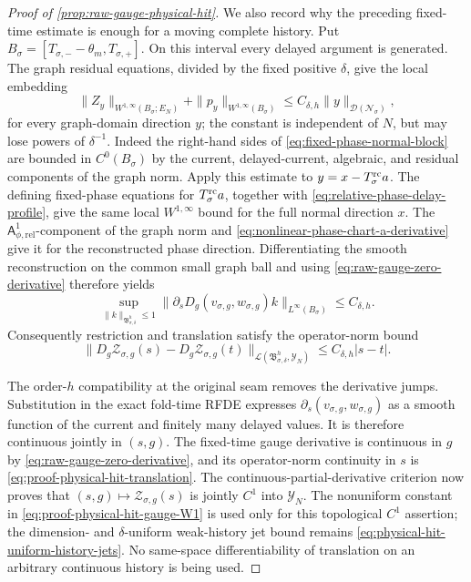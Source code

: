 \begin{proof}[Proof of
\cref{prop:raw-gauge-physical-hit}]
We also record why the preceding fixed-time estimate is enough for a moving
complete history.  Put
\(B_\sigma=[T_{\sigma,-}-\theta_m,T_{\sigma,+}]\).  On this interval every
delayed argument is generated.  The graph residual equations, divided by
the fixed positive \(\delta\), give the local embedding
\begin{equation}
 \|Z_y\|_{W^{1,\infty}(B_\sigma;E_N)}
 +\|p_y\|_{W^{1,\infty}(B_\sigma)}
 \le C_{\delta,h}\|y\|_{\mathcal D(\mathscr N_\sigma)},
                                                        \label{eq:proof-physical-hit-local-graph-embedding}
\end{equation}
for every graph-domain direction \(y\); the constant is independent of
\(N\), but may lose powers of \(\delta^{-1}\).  Indeed the right-hand sides
of \cref{eq:fixed-phase-normal-block} are bounded in \(C^0(B_\sigma)\) by
the current, delayed-current, algebraic, and residual components of the
graph norm.  Apply this estimate to
\(y=x-T_\sigma^{\rm rc}a\).  The defining fixed-phase equations for
\(T_\sigma^{\rm rc}a\), together with
\cref{eq:relative-phase-delay-profile}, give the same local
\(W^{1,\infty}\) bound for the full normal direction \(x\).  The
\(\mathsf A_{\phi,\mathrm{rel}}^1\)-component of the graph norm and
\cref{eq:nonlinear-phase-chart-a-derivative} give it for the reconstructed
phase direction.  Differentiating the smooth reconstruction on the common
small graph ball and using
\cref{eq:raw-gauge-zero-derivative} therefore yields
\begin{equation}
 \sup_{\|k\|_{\mathfrak B_{\sigma,\delta}^h}\le1}
 \|\partial_sD_g(v_{\sigma,g},w_{\sigma,g})k\|_
       {L^\infty(B_\sigma)}
 \le C_{\delta,h}.                              \label{eq:proof-physical-hit-gauge-W1}
\end{equation}
Consequently restriction and translation satisfy the operator-norm bound
\begin{equation}
 \|D_g\mathcal Z_{\sigma,g}(s)
       -D_g\mathcal Z_{\sigma,g}(t)\|_
       {\mathcal L(\mathfrak B_{\sigma,\delta}^h,\mathscr Y_N)}
 \le C_{\delta,h}|s-t|.                         \label{eq:proof-physical-hit-translation}
\end{equation}

The order-\(h\) compatibility at the original seam removes the derivative
jumps.  Substitution in the exact fold-time RFDE expresses
\(\partial_s(v_{\sigma,g},w_{\sigma,g})\) as a smooth function of the
current and finitely many delayed values.  It is therefore continuous
jointly in \((s,g)\).  The fixed-time gauge derivative is continuous in
\(g\) by \cref{eq:raw-gauge-zero-derivative}, and its operator-norm
continuity in \(s\) is \cref{eq:proof-physical-hit-translation}.  The
continuous-partial-derivative criterion now proves that
\((s,g)\mapsto\mathcal Z_{\sigma,g}(s)\) is jointly \(C^1\) into
\(\mathscr Y_N\).  The nonuniform constant in
\cref{eq:proof-physical-hit-gauge-W1} is used only for this topological
\(C^1\) assertion; the dimension- and \(\delta\)-uniform weak-history jet
bound remains \cref{eq:physical-hit-uniform-history-jets}.  No same-space
differentiability of translation on an arbitrary continuous history is
being used.


\end{proof}
